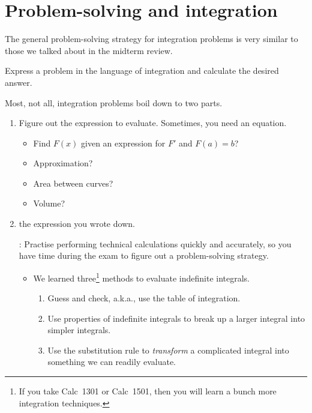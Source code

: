 \documentclass[../main.tex]{subfiles}
\begin{document}
 \section{Problem-solving and integration}
  The general problem-solving strategy for integration problems is very similar to those we talked about in the midterm review.

  \begin{mdframed}[style=simple]
    Express a problem in the language of integration and calculate the desired answer. 
  \end{mdframed}

  Most, not all, integration problems boil down to two parts.
  \begin{enumerate}[wide, label=\textbf{Part~\arabic*}.]
    \item Figure out the  expression to evaluate. Sometimes, you need an equation.

      \begin{itemize}[wide]
        \item Find \(F(x)\) given an expression for \(F'\) and \(F(a) = b\)?

        \item Approximation?  

        \item Area between curves?  

        \item Volume?  

      \end{itemize}

    \item {} the expression you wrote down. 

      : Practise performing technical calculations quickly and accurately, so you have time during the exam to figure out a problem-solving strategy.

      \begin{itemize}
        \item We learned three\footnote{If you take Calc~1301 or Calc~1501, then you will learn a bunch more integration techniques.} methods to evaluate indefinite integrals.

          \begin{enumerate}
            \item Guess and check, a.k.a., use the table of integration. 
            \item Use properties of indefinite integrals to break up a larger integral into simpler integrals. 
            \item Use the substitution rule to \emph{transform} a complicated integral into something we can readily evaluate.
          \end{enumerate}


\end{itemize}
\end{enumerate}
\end{document}
